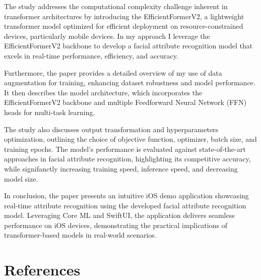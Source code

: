 \documentclass[a4paper,oneside]{article}
\begin{document}
The study addresses the computational complexity challenge inherent in transformer architectures by introducing the EfficientFormerV2, a lightweight transformer model optimized for efficient deployment on resource-constrained devices, particularly mobile devices.
In my approach I leverage the EfficientFormerV2 backbone to develop a facial attribute recognition model that excels in real-time performance, efficiency, and accuracy.

Furthermore, the paper provides a detailed overview of my use of data augmentation for training, enhancing dataset robustness and model performance.
It then describes the model architecture, which incorporates the EfficientFormerV2 backbone and multiple Feedforward Neural Network (FFN) heads for multi-task learning.

The study also discusses output transformation and hyperparameters optimization, outlining the choice of objective function, optimizer, batch size, and training epochs.
The model's performance is evaluated against state-of-the-art approaches in facial attribute recognition, highlighting its competitive accuracy, while signifanctly increasing training speed, inference speed, and decreasing model size.

In conclusion, the paper presents an intuitive iOS demo application showcasing real-time attribute recognition using the developed facial attribute recognition model.
Leveraging Core ML and SwiftUI, the application delivers seamless performance on iOS devices, demonstrating the practical implications of transformer-based models in real-world scenarios.

\newpage
\section{References}
\label{sec:references}




\end{document}
